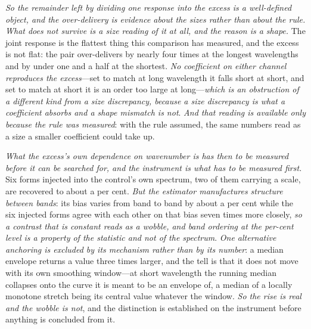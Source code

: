 \documentclass[11pt,a4paper]{article}
\theoremstyle{plain}
\theoremstyle{definition}
\theoremstyle{remark}
\begin{document}
\emph{So the remainder left by dividing one response into the excess is a well-defined object, and the
over-delivery is evidence about the sizes rather than about the rule.} \emph{What does not survive is a size
reading of it at all, and the reason is a shape.} The joint response is the flattest thing this comparison
has measured, and the excess is not flat: the pair over-delivers by nearly four times at the longest
wavelengths and by under one and a half at the shortest. \emph{No coefficient on either channel reproduces
the excess}---set to match at long wavelength it falls short at short, and set to match at short it is an
order too large at long---\emph{which is an obstruction of a different kind from a size discrepancy, because
a size discrepancy is what a coefficient absorbs and a shape mismatch is not}. \emph{And that reading is
available only because the rule was measured}: with the rule assumed, the same numbers read as a size a
smaller coefficient could take up.

\emph{What the excess's own dependence on wavenumber is has then to be measured before it can be searched
for, and the instrument is what has to be measured first.} Six forms injected into the control's own
spectrum, two of them carrying a scale, are recovered to about a per cent. \emph{But the estimator
manufactures structure between bands}: its bias varies from band to band by about a per cent while the six
injected forms agree with each other on that bias seven times more closely, \emph{so a contrast that is
constant reads as a wobble, and band ordering at the per-cent level is a property of the statistic and not
of the spectrum}. \emph{One alternative anchoring is excluded by its mechanism rather than by its number}:
a median envelope returns a value three times larger, and the tell is that it does not move with its own
smoothing window---at short wavelength the running median collapses onto the curve it is meant to be an
envelope of, a median of a locally monotone stretch being its central value whatever the window. \emph{So
the rise is real and the wobble is not}, and the distinction is established on the instrument before
anything is concluded from it.
\end{document}
